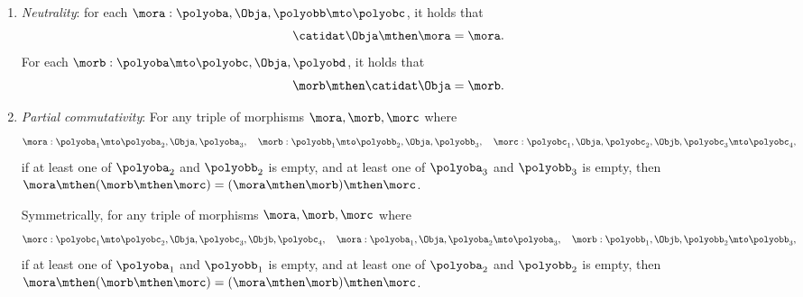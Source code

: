 \begin{ctdefinition}[Polycategory]
\begin{enumerate}
              $(\mora\mthen\morb)\mthen\morc$ and  $\mora\mthen(\morb\mthen\morc)$ coincide
              and so we indicate them as
              \begin{equation}
                  \mora\mthen\morb\mthen\morc \colon \polyobc_1 , \polyobb_1 ,  \polyoba_1 , \polyobb_2  ,\polyobc_2
                  \mto
                  \polyoba_2, \polyobb_3, \polyobc_3 ,\polyobb_4, \polyoba_3.
              \end{equation}
        \item \emph{Neutrality}: for each $\mora: \polyoba, \Obja, \polyobb \mto \polyobc$, it holds that
              \begin{equation}
                  \catidat\Obja  \mthen \mora  =\mora.
              \end{equation}
              For each $\morb: \polyoba \mto \polyobc, \Obja, \polyobd$, it holds that
              \begin{equation}
                  \morb \mthen \catidat\Obja =\morb.
              \end{equation}
        \item \emph{Partial commutativity}:
              For any triple of morphisms $\mora,\morb,\morc$ where
              \begin{equation}
                  \mora: \polyoba_1 \mto  \polyoba_2, \Obja, \polyoba_3,
                  \quad \morb: \polyobb_1 \mto  \polyobb_2, \Obja , \polyobb_3,
                  \quad
                  \morc: \polyobc_1, \Obja, \polyobc_2, \Objb , \polyobc_3 \mto \polyobc_4,
              \end{equation}
              if at least one of $\polyoba_2$ and $\polyobb_2$ is empty,
              and at least one of $\polyoba_3$ and $\polyobb_3$ is empty, then $\mora\mthen(\morb\mthen\morc)=(\mora\mthen\morb)\mthen\morc$.

              Symmetrically, for any triple of morphisms $\mora,\morb,\morc$ where
              \begin{equation}
                  \morc: \polyobc_1 \mto \polyobc_2, \Obja, \polyobc_3, \Objb , \polyobc_4,
                  \quad
                  \mora: \polyoba_1, \Obja, \polyoba_2 \mto \polyoba_3,
                  \quad
                  \morb: \polyobb_1, \Objb, \polyobb_2 \mto \polyobb_3,
              \end{equation}
              if at least one of $\polyoba_1$ and $\polyobb_1$ is empty,
              and at least one of $\polyoba_2$ and $\polyobb_2$ is empty, then $\mora\mthen(\morb\mthen\morc)=(\mora\mthen\morb)\mthen\morc$.
    \end{enumerate}
\end{ctdefinition}

